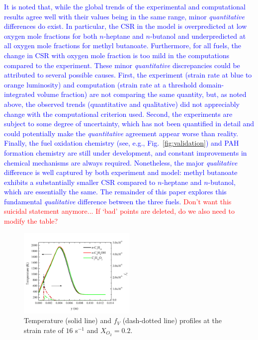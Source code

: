 \documentclass[review,3p,times]{elsarticleUS}
\begin{document}
\textcolor{blue}{It is noted that, while the global trends of the experimental and computational results agree well with their values being in the same range, minor \emph{quantitative} differences do exist. In particular, the CSR in the model is overpredicted at low oxygen mole fractions for both $n$-heptane and $n$-butanol and underpredicted at all oxygen mole fractions for methyl butanoate.  Furthermore, for all fuels, the change in CSR with oxygen mole fraction is too mild in the computations compared to the experiment.  These minor \emph{quantitative} discrepancies could be attributed to several possible causes.  First, the experiment (strain rate at blue to orange luminosity) and computation (strain rate at a threshold domain-integrated volume fraction) are not comparing the same quantity, but, as noted above, the observed trends (quantitative and qualitative) did not appreciably change with the computational criterion used.  Second, the experiments are subject to some degree of uncertainty, which has not been quantified in detail and could potentially make the \emph{quantitative} agreement appear worse than reality. Finally, the fuel oxidation chemistry (see, e.g., Fig.~\ref{fig:validation}) and PAH formation chemistry are still under development, and constant improvements in chemical mechanisms are always required.  Nonetheless, the major \emph{qualitative} difference is well captured by both experiment and model: methyl butanoate exhibits a substantially smaller CSR compared to $n$-heptane and $n$-butanol, which are essentially the same.  The remainder of this paper explores this fundamental \emph{qualitative} difference between the three fuels.}  \textcolor{red}{Don't want this suicidal statement anymore...  If `bad' points are deleted, do we also need to modify the table?} 

\begin{figure}[ht]
  \centering
  \scriptsize
  \vspace{-0.1in}
  \includegraphics[trim=4mm 8mm 4mm 20mm, clip=true, width=0.5\textwidth]{Thermal.png}
  \normalsize
  \vspace{-0.1in}
  \caption{Temperature (solid line) and $f_V$ (dash-dotted line) profiles at the strain rate of $16$ s$^{-1}$ and $X_{O_2}=0.2$.}
  \label{fig:thermal}
\end{figure}
\end{document}
